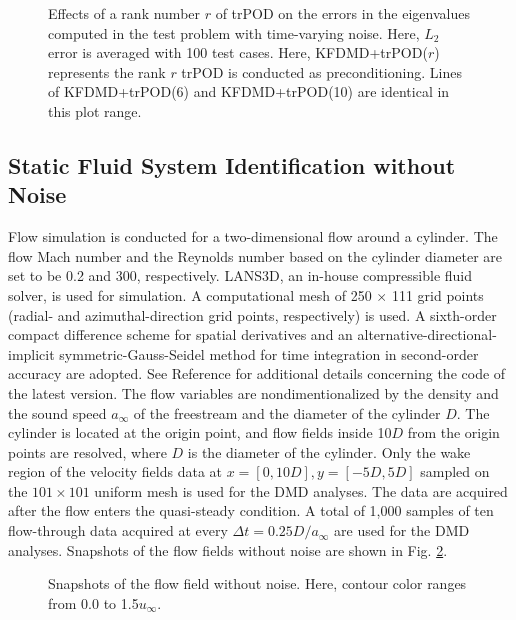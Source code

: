 \documentclass[aip,graphicx]{revtex4-1}
\begin{document}
\begin{figure}
   \caption{Effects of a rank number $r$ of trPOD on  the errors in the eigenvalues computed in the test problem with time-varying noise. Here, $L_2$ error is averaged with 100 test cases. Here, KFDMD+trPOD($r$) represents the rank $r$ trPOD is conducted as preconditioning. Lines of KFDMD+trPOD(6) and KFDMD+trPOD(10) are identical in this plot range.}	
   \label{fig:diffr_eigenerror}
\end{figure}
\clearpage

\subsection{Static Fluid System Identification without Noise}
\label{sec:FluidWON}
Flow simulation is conducted for a two-dimensional flow around a cylinder. The flow Mach number and the Reynolds number based on the cylinder diameter are set to be 0.2 and 300, respectively. LANS3D,\cite{Fujii1990a} an in-house compressible fluid solver, is used for simulation. A computational mesh of 250 $\times$ 111 grid points (radial- and azimuthal-direction grid points, respectively) is used. A sixth-order compact difference scheme\cite{Lele1992} for spatial derivatives and an alternative-directional-implicit symmetric-Gauss-Seidel method\cite{Fujii1999,Nishida2009} for time integration in second-order accuracy are adopted. See Reference\cite{Sato2015b}  for additional details concerning the code of the latest version. The flow variables are nondimentionalized by the density and the sound speed $a_\infty$ of the freestream and the diameter of the cylinder $D$. The cylinder is located at the origin point, and flow fields inside 10$D$ from the origin points are resolved, where $D$ is the diameter of the cylinder. Only the wake region of the velocity fields data at $x=[0,10D], y=[-5D,5D]$ sampled on the $101 \times 101$ uniform mesh is used for the DMD analyses. The data are acquired after the flow enters the quasi-steady condition.
A total of 1,000 samples of ten flow-through data acquired at every $\Delta t=0.25 D/a_{\infty}$ are used for the DMD analyses. Snapshots of the flow fields without noise are shown in Fig. \ref{fig:flowwo}.

\begin{figure}
	\caption{Snapshots of the flow field without noise. Here, contour color ranges from 0.0 to 1.5$u_\infty$.}
	\label{fig:flowwo}
\end{figure}
\end{document}
